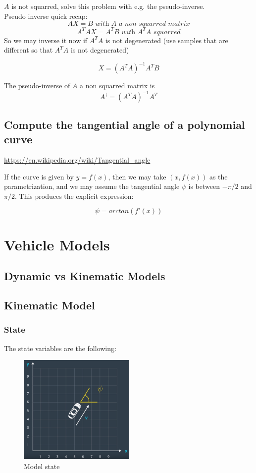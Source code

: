 \documentclass[11pt]{article}
\begin{document}
$A$ is not squarred, solve this problem with e.g. the pseudo-inverse. \\

Pseudo inverse quick recap:
$$AX=B \textit{ with A a non squarred matrix}$$
$$A^T AX=A^TB \textit{ with }A^TA \textit{ squarred}$$
So we may inverse it now if $A^TA$ is not degenerated (use samples that are  different so that $A^TA$ is not degenerated)

$$X=(A^TA)^{-1}A^TB$$

The pseudo-inverse of $A$ a non squarred matrix is
$$ A^\dagger = (A^TA)^{-1}A^T$$

\subsection{Compute the tangential angle of a polynomial curve}

\url{https://en.wikipedia.org/wiki/Tangential_angle}

If the curve is given by $y = f(x)$, then we may take $(x, f(x))$ as the parametrization, and we may assume the tangential angle $\psi$ is between $−\pi/2$ and $\pi/2$. This produces the explicit expression:

$$ \psi = arctan(f'(x))$$ 


\section{Vehicle Models}

\subsection{Dynamic vs Kinematic Models}

\subsection{Kinematic Model}

\subsubsection{State}

The state variables are the following:

\begin{figure}[h]
    \centering
    \includegraphics[width=0.5\textwidth]{state}
    \caption{Model state}
    \label{fig:state}
\end{figure}
\FloatBarrier
\end{document}
